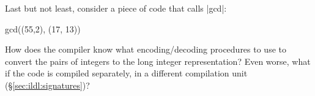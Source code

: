 Last but not least, consider a piece of code that calls |gcd|:

\begin{lstlisting-nobreak}
gcd((55,2), (17, 13))
\end{lstlisting-nobreak}

How does the compiler know what encoding/decoding procedures to use to convert the pairs of integers to the long integer representation? Even worse, what if the code is compiled separately, in a different compilation unit (\S\ref{sec:ildl:signatures})?

